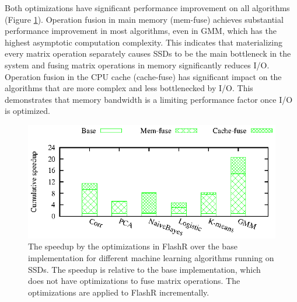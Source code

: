 Both optimizations have significant performance improvement on all algorithms
(Figure \ref{perf:em_opts}). Operation fusion in main memory (mem-fuse) achieves
substantial performance improvement in most algorithms, even in GMM,
which has the highest asymptotic computation complexity.
This indicates that materializing every matrix operation
separately causes SSDs to be the main bottleneck in the system and
fusing matrix operations in memory significantly reduces I/O.
Operation fusion in the CPU cache (cache-fuse) has significant impact
on the algorithms that are more complex and less bottlenecked by I/O.
This demonstrates that memory bandwidth is a limiting performance factor
once I/O is optimized.

\begin{figure}
	\begin{center}
		\footnotesize
		\includegraphics{FlashMatrix_figs/opts-EM.eps}
		\vspace{-10pt}
		\caption{The speedup by the optimizations in FlashR over the base
		implementation for different machine learning algorithms running on SSDs.
		The speedup is relative to the base implementation, which does not have
		optimizations to fuse matrix operations. The optimizations are applied
		to FlashR incrementally.}
		\label{perf:em_opts}
	\end{center}
  \vspace{-15pt}
\end{figure}
